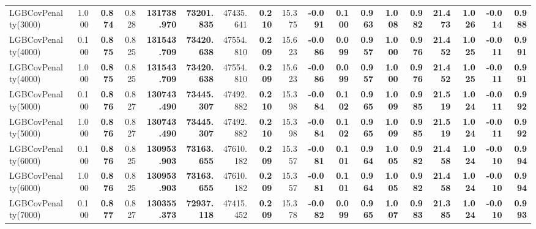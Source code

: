 \documentclass[11pt]{article}
\theoremstyle{plain}
\theoremstyle{definition}
\newcommand{\1}{\mathbf{1}}
\begin{document}
\begin{table}[htbp]
{\begin{tabular}{lrrrrrrrrrrrrrrrrr}
LGBCovPenalty(3000) & 1.000 & \textbf{0.874} & 0.828 & \textbf{131738.970} & \textbf{73201.835} & 47435.641 & \textbf{0.210} & 15.375 & \textbf{-0.091} & \textbf{0.100} & \textbf{0.963} & \textbf{1.008} & \textbf{0.982} & \textbf{21.473} & \textbf{1.026} & \textbf{-0.014} & \textbf{0.988} \\
LGBCovPenalty(4000) & 0.100 & \textbf{0.875} & 0.825 & \textbf{131543.709} & \textbf{73420.638} & 47554.810 & \textbf{0.209} & 15.623 & \textbf{-0.086} & \textbf{0.099} & \textbf{0.957} & \textbf{1.000} & \textbf{0.976} & \textbf{21.452} & \textbf{1.025} & \textbf{-0.011} & \textbf{0.991} \\
LGBCovPenalty(4000) & 1.000 & \textbf{0.875} & 0.825 & \textbf{131543.709} & \textbf{73420.638} & 47554.810 & \textbf{0.209} & 15.623 & \textbf{-0.086} & \textbf{0.099} & \textbf{0.957} & \textbf{1.000} & \textbf{0.976} & \textbf{21.452} & \textbf{1.025} & \textbf{-0.011} & \textbf{0.991} \\
LGBCovPenalty(5000) & 0.100 & \textbf{0.876} & 0.827 & \textbf{130743.490} & \textbf{73445.307} & 47492.882 & \textbf{0.210} & 15.398 & \textbf{-0.084} & \textbf{0.102} & \textbf{0.965} & \textbf{1.009} & \textbf{0.985} & \textbf{21.519} & \textbf{1.024} & \textbf{-0.011} & \textbf{0.992} \\
LGBCovPenalty(5000) & 1.000 & \textbf{0.876} & 0.827 & \textbf{130743.490} & \textbf{73445.307} & 47492.882 & \textbf{0.210} & 15.398 & \textbf{-0.084} & \textbf{0.102} & \textbf{0.965} & \textbf{1.009} & \textbf{0.985} & \textbf{21.519} & \textbf{1.024} & \textbf{-0.011} & \textbf{0.992} \\
LGBCovPenalty(6000) & 0.100 & \textbf{0.876} & 0.825 & \textbf{130953.903} & \textbf{73163.655} & 47610.182 & \textbf{0.209} & 15.357 & \textbf{-0.081} & \textbf{0.101} & \textbf{0.964} & \textbf{1.005} & \textbf{0.982} & \textbf{21.458} & \textbf{1.024} & \textbf{-0.010} & \textbf{0.994} \\
LGBCovPenalty(6000) & 1.000 & \textbf{0.876} & 0.825 & \textbf{130953.903} & \textbf{73163.655} & 47610.182 & \textbf{0.209} & 15.357 & \textbf{-0.081} & \textbf{0.101} & \textbf{0.964} & \textbf{1.005} & \textbf{0.982} & \textbf{21.458} & \textbf{1.024} & \textbf{-0.010} & \textbf{0.994} \\
LGBCovPenalty(7000) & 0.100 & \textbf{0.877} & 0.827 & \textbf{130355.373} & \textbf{72937.118} & 47415.452 & \textbf{0.209} & 15.378 & \textbf{-0.082} & \textbf{0.099} & \textbf{0.965} & \textbf{1.007} & \textbf{0.983} & \textbf{21.385} & \textbf{1.024} & \textbf{-0.010} & \textbf{0.993} \\

\end{tabular}}
\end{table}
\end{document}
